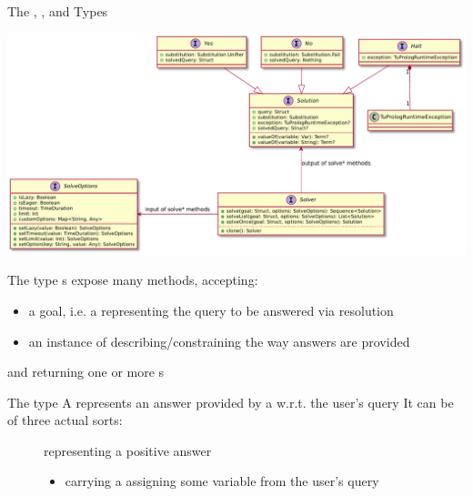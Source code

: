 \documentclass[handout]{beamer}
\begin{document}
\begin{frame}[allowframebreaks]{The , , and  Types}




    \begin{center}
        \includegraphics[width=\linewidth]{img/solve-io.pdf}
    \end{center}

    \begin{block}{The  type}
        s expose many  methods, accepting:
        \begin{itemize}
            \item a \alert{goal}, i.e. a  representing the query to be answered via resolution
            \item an instance of  describing/constraining the way answers are provided
        \end{itemize}
        and returning one or more s
    \end{block}

    \begin{block}{The  type}
        A  represents an answer provided by a  w.r.t. the user's query
        It can be of three actual sorts:
        \begin{description}
            \item[] representing a positive answer
            \begin{itemize}\small
                \item carrying a  assigning some variable from the user's query
            \end{itemize}


\end{description}
\end{block}
\end{frame}
\end{document}

